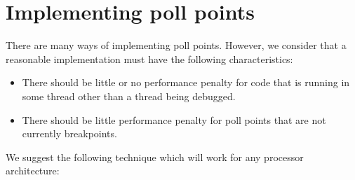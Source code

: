 \chapter{Implementing poll points}
\label{app-implementing-poll-points}

There are many ways of implementing poll points.  However, we consider
that a reasonable implementation must have the following
characteristics:

\begin{itemize}
\item There should be little or no performance penalty for code that
  is running in some thread other than a thread being debugged.
\item There should be little performance penalty for poll points that
  are not currently breakpoints.
\end{itemize}

We suggest the following technique which will work for any processor
architecture:

